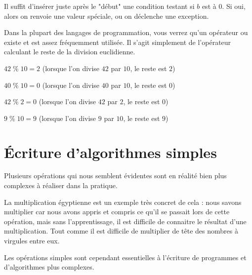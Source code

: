 \documentclass[11pt,a4paper]{article}
\begin{document}

Il suffit d'insérer juste après le "début" une condition testant si $ b $ est à $ 0 $.
Si oui, alors on renvoie une valeur spéciale, ou on déclenche une exception.

\bigskip

Dans la plupart des langages de programmation, vous verrez qu'un opérateur  ou \TTBF{\%} existe et est assez fréquemment utilisée.
Il s'agit simplement de l'opérateur calculant le reste de la division euclidienne.

$ 42 \; \% \; 10 = 2 $ (lorsque l'on divise $ 42 $ par $ 10 $, le reste est $ 2 $)

$ 40 \; \% \; 10 = 0 $ (lorsque l'on divise $ 40 $ par $ 10 $, le reste est $ 0 $)

$ 42 \; \% \; 2 = 0 $ (lorsque l'on divise $ 42 $ par $ 2 $, le reste est $ 0 $)

$ 9 \; \% \; 10 = 9 $ (lorsque l'on divise $ 9 $ par $ 10 $, le reste est $ 9 $)


\vfillLast

\newpage


\section{\'Ecriture d'algorithmes simples}

\bigskip

Plusieurs opérations qui nous semblent évidentes sont en réalité bien plus complexes à réaliser dans la pratique.

La multiplication égyptienne est un exemple très concret de cela : nous savons multiplier car nous avons appris et compris ce qu'il se passait lors de cette opération, mais sans l'apprentissage, il est difficile de connaitre le résultat d'une multiplication.
Tout comme il est difficile de multiplier de tête des nombres à virgules entre eux.

Les opérations simples sont cependant essentielles à l'écriture de programmes et d'algorithmes plus complexes.

\bigskip

\vspace*{3cm}

\bigskip
\end{document}
